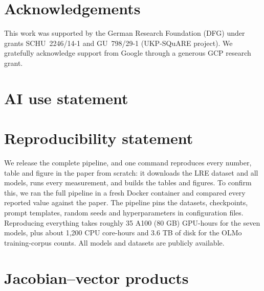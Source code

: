\documentclass{article}
\begin{document}

\label{sec:main-end}
\clearpage

\ifdefined\arxivversion
\section*{Acknowledgements}
This work was supported by the German Research Foundation (DFG) under
grants SCHU~2246/14-1 and GU~798/29-1 (UKP-SQuARE project).
We gratefully acknowledge support from Google through a generous GCP research grant.
\fi

\section*{AI use statement}


\section*{Reproducibility statement}
 We release the complete pipeline, and one command reproduces every number, table and figure in the paper from scratch: it downloads the LRE dataset and all models, runs every measurement, and builds the tables and figures. To confirm this, we ran the full pipeline in a fresh Docker container and compared every reported value against the paper. The pipeline pins the datasets, checkpoints, prompt templates, random seeds and hyperparameters in configuration files. Reproducing everything takes roughly 35 A100 (80 GB) GPU-hours for the seven models, plus about 1,200 CPU core-hours and 3.6 TB of disk for the OLMo training-corpus counts. All models and datasets are publicly available.



\clearpage
\appendix



\clearpage



\section{Jacobian--vector products}
\label{sec:jvp}
\end{document}
